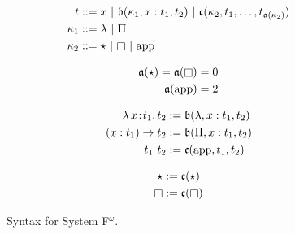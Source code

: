 
\begin{figure}
    \centering
    \begin{align*}
        t &::= x\ |\ \mathfrak{b}(\kappa_1, x : t_1, t_2)\ |\ \mathfrak{c}(\kappa_2, t_1, \ldots, t_{\mathfrak{a}(\kappa_2)}) \\
        \kappa_1 &::= \lambda\ |\ \Pi \\
        \kappa_2 &::=\star\ |\ \kind\ |\ \text{app}
    \end{align*}%
    \begin{minipage}{0.32\textwidth}
        \vspace{-.2in}
        \begin{align*}
            \mathfrak{a}(\star) = \mathfrak{a}(\kind) &= 0 \\
            \mathfrak{a}(\text{app}) &= 2
        \end{align*}
    \end{minipage}%
    \begin{minipage}{0.32\textwidth}
        \vspace{-.2in}
        \begin{align*}
            {\lambda}\, x\! : \! t_1.\, t_2 &:= \mathfrak{b}(\lambda, x : t_1, t_2) \\
            (x : t_1) \to t_2 &:= \mathfrak{b}(\Pi, x : t_1, t_2) \\
            t_1\ t_2 &:= \mathfrak{c}(\text{app}, t_1, t_2)
        \end{align*}
    \end{minipage}%
    \begin{minipage}{0.32\textwidth}
        \vspace{-.2in}
        \begin{align*}
            \star &:= \mathfrak{c}(\star) \\
            \kind &:= \mathfrak{c}(\kind)
        \end{align*}
    \end{minipage}
    \vspace{.2in}
    \caption{Syntax for System F$^\omega$.}
    \label{fig:syntax_f}
\end{figure}
